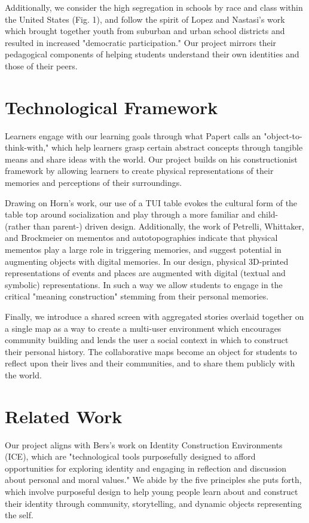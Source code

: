 \documentclass{sigchi-ext}
\begin{document}
Additionally, we consider the high segregation in schools by race and class within the United States (Fig. 1), and follow the spirit of Lopez and Nastasi's work which brought together youth from suburban and urban school districts and resulted in increased "democratic participation." Our project mirrors their pedagogical components of helping students understand their own identities and those of their peers.

\section{Technological Framework}
Learners engage with our learning goals through what Papert calls an "object-to-think-with," which help learners grasp certain abstract concepts through tangible means and share ideas with the world. Our project builds on his constructionist framework by allowing learners to create physical representations of their memories and perceptions of their surroundings. 

Drawing on Horn's work, our use of a TUI table evokes the cultural form of the table top around socialization and play through a more familiar and child- (rather than parent-) driven design. Additionally, the work of Petrelli, Whittaker, and Brockmeier on mementos and autotopographies indicate that physical mementos play a large role in triggering memories, and suggest potential in augmenting objects with digital memories. In our design, physical 3D-printed representations of events and places are augmented with digital (textual and symbolic) representations. In such a way we allow students to engage in the critical "meaning construction" stemming from their personal memories.

Finally, we introduce a shared screen with aggregated stories overlaid together on a single map as a way to create a multi-user environment which encourages community building and lends the user a social context in which to construct their personal history. The collaborative maps become an object for students to reflect upon their lives and their communities, and to share them publicly with the world.

\section{Related Work}

Our project aligns with Bers's work on Identity Construction Environments (ICE), which are "technological tools purposefully designed to afford opportunities for exploring identity and engaging in reflection and discussion about personal and moral values." We abide by the five principles she puts forth, which involve purposeful design to help young people learn about and construct their identity through community, storytelling, and dynamic objects representing the self.
\end{document}
